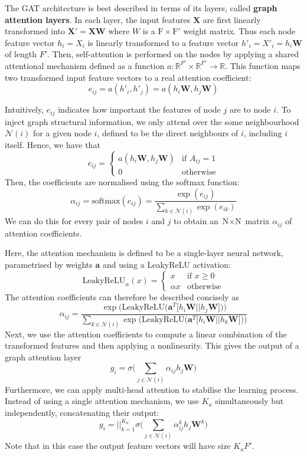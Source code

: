 \documentclass[12pt]{article}
\theoremstyle{definition}
\begin{document}
The GAT architecture is best described in terms of its layers, called \textbf{graph attention layers}. In each layer, the input features $\textbf{X}$ are first linearly transformed into $\textbf{X}' = \textbf{X}\textbf{W}$ where $W$ is a $\textrm{F} \times \textrm{F}'$ weight matrix. Thus each node feature vector $h_i = X_i$ is linearly transformed to a feature vector $h'_i = X'_i = h_i \textbf{W}$ of length $F'$. Then, self-attention is performed on the nodes by applying a shared attentional mechanism defined as a function $a: \mathbb{R}^{F'} \times \mathbb{R}^{F'} \to \mathbb{R}$. This function maps two transformed input feature vectors to a real attention coefficient:
\[
e_{ij} = a(h'_i, h'_j) = a(h_i \textbf{W}, h_j \textbf{W})
\]

Intuitively, $e_{ij}$ indicates how important the features of node $j$ are to node $i$. To inject graph structural information, we only attend over the some neighbourhood $\mathcal{N}(i)$ for a given node $i$, defined to be the direct neighbours of $i$, including $i$ itself. Hence, we have that
\begin{equation*}
e_{ij} = \begin{cases}
				a(h_i \textbf{W}, h_j \textbf{W}) &\text{if $A_{ij} = 1$}\\
				0 &\text{otherwise}
			\end{cases}
\end{equation*}
Then, the coefficients are normalised using the softmax function:
\[
\alpha_{ij} = \textrm{softmax}(e_{ij}) = \frac{\exp(e_{ij})}{\sum_{k \in \mathcal{N}(i)} \exp(e_{ik})}
\]
We can do this for every pair of nodes $i$ and $j$ to obtain an $\textrm{N} \times \textrm{N}$ matrix $\alpha_{ij}$ of attention coefficients.

Here, the attention mechanism is defined to be a single-layer neural network, parametrised by weights $\textbf{a}$ and using a LeakyReLU activation: 
\[
\textrm{LeakyReLU}_{\alpha}(x) = 
	\begin{cases}
		x &\text{if $x \ge 0$}\\
		\alpha x &\text{otherwise}
	\end{cases}
\]
The attention coefficients can therefore be described concisely as
\[
\alpha_{ij} = \frac{\exp \big( \textrm{LeakyReLU}\big( \textbf{a}^T \big[ h_i \textbf{W} \vert\vert h_j \textbf{W} \big] \big) \big)}
{
\sum_{k \in \mathcal{N}(i)} \exp \big( \textrm{LeakyReLU}\big( \textbf{a}^T \big[ h_i \textbf{W} \vert\vert h_k \textbf{W} \big] \big) \big)
}
\]
Next, we use the attention coefficients to compute a linear combination of the transformed features and then applying a nonlinearity. This gives the output of a graph attention layer
\[
g_i = \sigma \big( \sum_{j \in \mathcal{N}(i)} \alpha_{ij} h_j \textbf{W} \big)
\]
Furthermore, we can apply multi-head attention to stabilise the learning process. Instead of using a single attention mechanism, we use $K_a$ simultaneously but independently, concatenating their output:
\[
g_i = {\Big\vert\Big\vert}_{k=1}^{K_a} \sigma \big( \sum_{j \in \mathcal{N}(i)} \alpha_{ij}^k h_j \textbf{W}^k \big)
\]
Note that in this case the output feature vectors will have size $K_a F'$.
\end{document}
